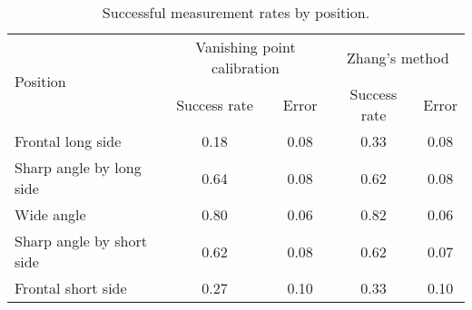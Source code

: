 \begin{table}
\centering
\begin{tabular}{@{} l *4c @{}}
\toprule
\multirow{2}{*}{Position} & \multicolumn{2}{c}{Vanishing point calibration} & \multicolumn{2}{c}{Zhang's method}\\ 
\cmidrule(r){2-3}
\cmidrule(r){4-5}
& Success rate & Error & Success rate & Error \\
\midrule
 Frontal long side 			& 0.18 & 0.08 & 0.33 & 0.08 \\ 
 Sharp angle by long side  	& 0.64 & 0.08 & 0.62 & 0.08 \\
 Wide angle 				& 0.80 & 0.06 & 0.82 & 0.06 \\
 Sharp angle by short side 	& 0.62 & 0.08 & 0.62 & 0.07 \\
 Frontal short side 		& 0.27 & 0.10 & 0.33 & 0.10 \\
\bottomrule
 \end{tabular}
 \caption{Successful measurement rates by position.}
\label{table:measurement_by_position}
\end{table}